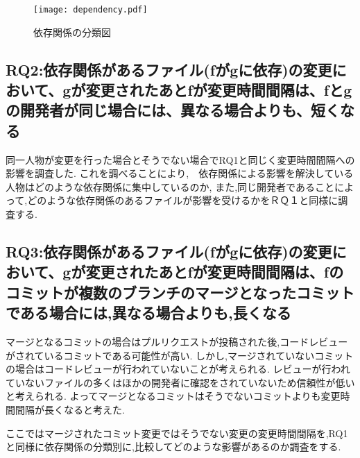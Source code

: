 \documentclass{fose2016}           %
\begin{document}
\begin{figure}[t]
\centering
\texttt{[image: dependency.pdf]}
\caption{依存関係の分類図}
\label{fig:dependency} 
\end{figure}

\subsection{RQ2:依存関係があるファイル(fがgに依存)の変更において、gが変更されたあとfが変更時間間隔は、fとgの開発者が同じ場合には、異なる場合よりも、短くなる}
同一人物が変更を行った場合とそうでない場合でRQ1と同じく変更時間間隔への影響を調査した.
これを調べることにより,　依存関係による影響を解決している人物はどのような依存関係に集中しているのか,
また,同じ開発者であることによって,どのような依存関係のあるファイルが影響を受けるかをＲＱ１と同様に調査する.

\subsection{RQ3:依存関係があるファイル(fがgに依存)の変更において、gが変更されたあとfが変更時間間隔は、fのコミットが複数のブランチのマージとなったコミットである場合には,異なる場合よりも,長くなる}
マージとなるコミットの場合はプルリクエストが投稿された後,コードレビューがされているコミットである可能性が高い.
しかし,マージされていないコミットの場合はコードレビューが行われていないことが考えられる.
レビューが行われていないファイルの多くはほかの開発者に確認をされていないため信頼性が低いと考えられる.
よってマージとなるコミットはそうでないコミットよりも変更時間間隔が長くなると考えた.

ここではマージされたコミット変更ではそうでない変更の変更時間間隔を,RQ1と同様に依存関係の分類別に,比較してどのような影響があるのか調査をする.

\end{document}

